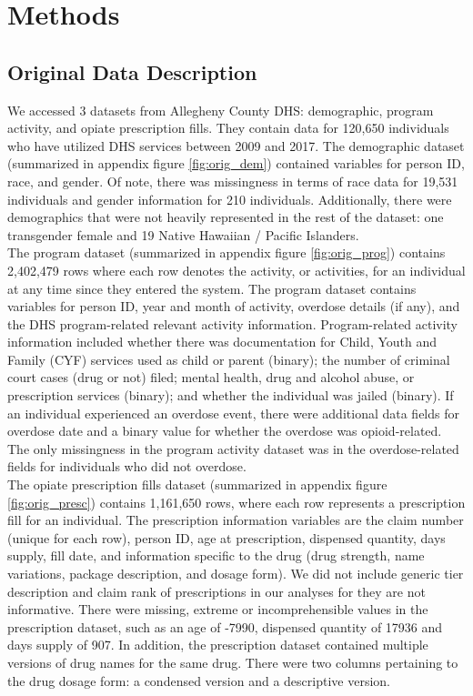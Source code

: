 \documentclass[twoside,10.5pt]{article}
\begin{document}
\section{Methods}
\subsection{Original Data Description}
We accessed 3 datasets from Allegheny County DHS: demographic, program activity, and opiate prescription fills. They contain data for 120,650 individuals who have utilized DHS services between 2009 and 2017. The demographic dataset (summarized in appendix figure \ref{fig:orig_dem}) contained variables for person ID, race, and gender. Of note, there was missingness in terms of race data for 19,531 individuals and gender information for 210 individuals. Additionally, there were demographics that were not heavily represented in the rest of the dataset: one transgender female and 19 Native Hawaiian / Pacific Islanders. \\

The program dataset (summarized in appendix figure \ref{fig:orig_prog}) contains 2,402,479 rows where each row denotes the activity, or activities, for an individual at any time since they entered the system. The program dataset contains variables for person ID, year and month of activity, overdose details (if any), and the DHS program-related relevant activity information. Program-related activity information included whether there was documentation for Child, Youth and Family (CYF) services used as child or parent (binary); the number of criminal court cases (drug or not) filed; mental health, drug and alcohol abuse, or prescription services (binary); and whether the individual was jailed (binary). If an individual experienced an overdose event, there were additional data fields for overdose date and a binary value for whether the overdose was opioid-related. The only missingness in the program activity dataset was in the overdose-related fields for individuals who did not overdose. \\

The opiate prescription fills dataset (summarized in appendix figure \ref{fig:orig_presc}) contains 1,161,650 rows, where each row represents a prescription fill for an individual. The prescription information variables are the claim number (unique for each row), person ID, age at prescription, dispensed quantity, days supply, fill date, and information specific to the drug (drug strength, name variations, package description, and dosage form). We did not include generic tier description and claim rank of prescriptions in our analyses for they are not informative. There were missing, extreme or incomprehensible values in the prescription dataset, such as an age of -7990, dispensed quantity of 17936 and days supply of 907. In addition, the prescription dataset contained multiple versions of drug names for the same drug. There were two columns pertaining to the drug dosage form: a condensed version and a descriptive version.
\end{document}

